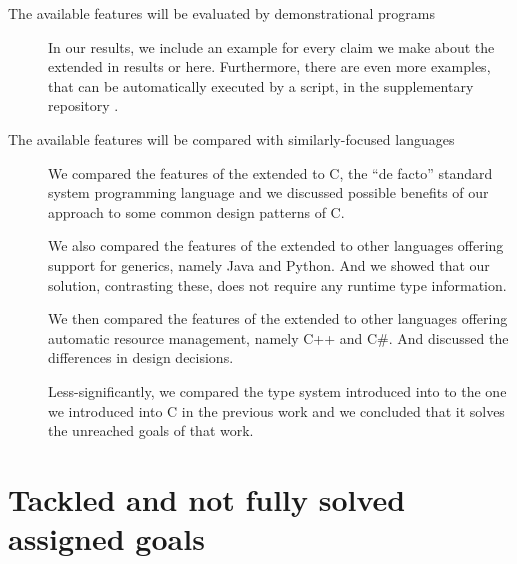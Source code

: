 \begin{description}
    \item[The available features will be evaluated by demonstrational programs] In our results, we include an example for every claim we make about the extended \cmm{} in results or here. Furthermore, there are even more examples, that can be automatically executed by a script, in the supplementary repository \cite{klepl2022compiler}.

    \item[The available features will be compared with similarly-focused languages] We compared the features of the extended \cmm{} to C, the ``de facto'' standard system programming language and we discussed possible benefits of our approach to some common design patterns of C.

    We also compared the features of the extended \cmm{} to other languages offering support for generics, namely Java and Python. And we showed that our solution, contrasting these, does not require any runtime type information.

    We then compared the features of the extended \cmm{} to other languages offering automatic resource management, namely C++ and C\#. And discussed the differences in design decisions.

    Less-significantly, we compared the type system introduced into \cmm{} to the one we introduced into C in the previous work and we concluded that it solves the unreached goals of that work.
\end{description}

\section*{Tackled and not fully solved assigned goals}

